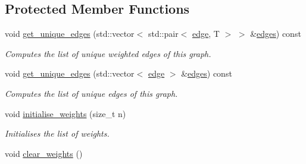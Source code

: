 \subsection*{Protected Member Functions}
\begin{DoxyCompactItemize}
\item 
void \hyperlink{classlgraph_1_1wugraph_abb036224cbf72abe1f5d17ec27b81c57}{get\-\_\-unique\-\_\-edges} (std\-::vector$<$ std\-::pair$<$ \hyperlink{namespacelgraph_a76bd7d50719f03de7a85db259d80d572}{edge}, T $>$ $>$ \&\hyperlink{classlgraph_1_1wxgraph_aed7f8e1486d9e2352fc1891521913b4f}{edges}) const 
\begin{DoxyCompactList}\small\item\em Computes the list of unique weighted edges of this graph. \end{DoxyCompactList}\item 
void \hyperlink{classlgraph_1_1wugraph_a4617d791f0a3af5e2e32661b3a8377d1}{get\-\_\-unique\-\_\-edges} (std\-::vector$<$ \hyperlink{namespacelgraph_a76bd7d50719f03de7a85db259d80d572}{edge} $>$ \&\hyperlink{classlgraph_1_1wxgraph_aed7f8e1486d9e2352fc1891521913b4f}{edges}) const 
\begin{DoxyCompactList}\small\item\em Computes the list of unique edges of this graph. \end{DoxyCompactList}\item 
\hypertarget{classlgraph_1_1wxgraph_a3d0eed0195489df5db3e9383a5c91344}{void \hyperlink{classlgraph_1_1wxgraph_a3d0eed0195489df5db3e9383a5c91344}{initialise\-\_\-weights} (size\-\_\-t n)}\label{classlgraph_1_1wxgraph_a3d0eed0195489df5db3e9383a5c91344}

\begin{DoxyCompactList}\small\item\em Initialises the list of weights. \end{DoxyCompactList}\item 
\hypertarget{classlgraph_1_1wxgraph_a805868af4e350ccb6a4555cff3822d22}{void \hyperlink{classlgraph_1_1wxgraph_a805868af4e350ccb6a4555cff3822d22}{clear\-\_\-weights} ()}\label{classlgraph_1_1wxgraph_a805868af4e350ccb6a4555cff3822d22}


\end{DoxyCompactItemize}
